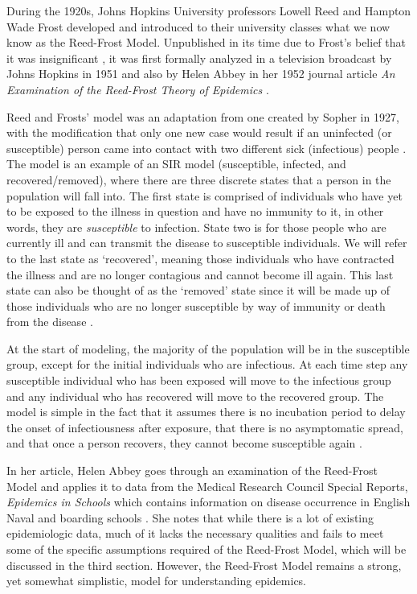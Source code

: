 During the 1920s, Johns Hopkins University professors Lowell Reed and Hampton Wade Frost developed and introduced to their university classes what we now know as the Reed-Frost Model. Unpublished in its time due to Frost’s belief that it was insignificant \cite{dietz}, it was first formally analyzed in a television broadcast by Johns Hopkins in 1951 \cite{reed} and also by Helen Abbey in her 1952 journal article \emph{An Examination of the Reed-Frost Theory of Epidemics} \cite{abbey}.

Reed and Frosts’ model was an adaptation from one created by Sopher in 1927, with the modification that only one new case would result if an uninfected (or susceptible) person came into contact with two different sick (infectious) people \cite{abbey}. The model is an example of an SIR model (susceptible, infected, and recovered/removed), where there are three discrete states that a person in the population will fall into. The first state is comprised of individuals who have yet to be exposed to the illness in question and have no immunity to it, in other words, they are \emph{susceptible} to infection. State two is for those people who are currently ill and can transmit the disease to susceptible individuals. We will refer to the last state as ‘recovered’, meaning those individuals who have contracted the illness and are no longer contagious and cannot become ill again. This last state can also be thought of as the ‘removed’ state since it will be made up of those individuals who are no longer susceptible by way of immunity or death from the disease \cite{mark}. 

At the start of modeling, the majority of the population will be in the susceptible group, except for the initial individuals who are infectious. At each time step any susceptible individual who has been exposed will move to the infectious group and any individual who has recovered will move to the recovered group. The model is simple in the fact that it assumes there is no incubation period to delay the onset of infectiousness after exposure, that there is no asymptomatic spread, and that once a person recovers, they cannot become susceptible again \cite{halloran}.

In her article, Helen Abbey goes through an examination of the Reed-Frost Model and applies it to data from the Medical Research Council Special Reports, \emph{Epidemics in Schools} which contains information on disease occurrence in English Naval and boarding schools \cite{abbey}. She notes that while there is a lot of existing epidemiologic data, much of it lacks the necessary qualities and fails to meet some of the specific assumptions required of the Reed-Frost Model, which will be discussed in the third section. However, the Reed-Frost Model remains a strong, yet somewhat simplistic, model for understanding epidemics. 